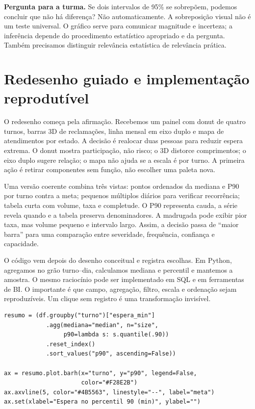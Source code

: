 \begin{GuidedBox}
\textbf{Pergunta para a turma.} Se dois intervalos de 95\% se sobrepõem, podemos concluir que não há diferença? Não automaticamente. A sobreposição visual não é um teste universal. O gráfico serve para comunicar magnitude e incerteza; a inferência depende do procedimento estatístico apropriado e da pergunta. Também precisamos distinguir relevância estatística de relevância prática.
\end{GuidedBox}


\section{Redesenho guiado e implementação reprodutível}

O redesenho começa pela afirmação. Recebemos um painel com donut de quatro turnos, barras 3D de reclamações, linha mensal em eixo duplo e mapa de atendimentos por estado. A decisão é realocar duas pessoas para reduzir espera extrema. O donut mostra participação, não risco; o 3D distorce comprimentos; o eixo duplo sugere relação; o mapa não ajuda se a escala é por turno. A primeira ação é retirar componentes sem função, não escolher uma paleta nova.

Uma versão coerente combina três vistas: pontos ordenados da mediana e P90 por turno contra a meta; pequenos múltiplos diários para verificar recorrência; tabela curta com volume, taxa e completude. O P90 representa cauda, a série revela quando e a tabela preserva denominadores. A madrugada pode exibir pior taxa, mas volume pequeno e intervalo largo. Assim, a decisão passa de ``maior barra'' para uma comparação entre severidade, frequência, confiança e capacidade.

O código vem depois do desenho conceitual e registra escolhas. Em Python, agregamos no grão turno--dia, calculamos mediana e percentil e mantemos a amostra. O mesmo raciocínio pode ser implementado em SQL e em ferramentas de BI. O importante é que campo, agregação, filtro, escala e ordenação sejam reproduzíveis. Um clique sem registro é uma transformação invisível.

\begin{verbatim}
resumo = (df.groupby("turno")["espera_min"]
            .agg(mediana="median", n="size",
                 p90=lambda s: s.quantile(.90))
            .reset_index()
            .sort_values("p90", ascending=False))

ax = resumo.plot.barh(x="turno", y="p90", legend=False,
                      color="#F28E2B")
ax.axvline(5, color="#4B5563", linestyle="--", label="meta")
ax.set(xlabel="Espera no percentil 90 (min)", ylabel="")
\end{verbatim}

